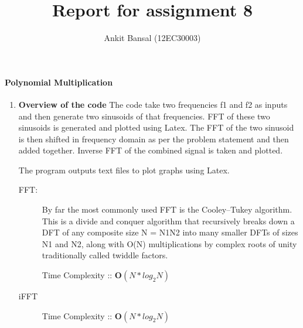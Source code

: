 \documentclass[a4paper,11pt]{article}
\title{Report for assignment 8}
\author{Ankit Bansal (12EC30003)}
\begin{document}
\maketitle

\paragraph{Polynomial Multiplication}
\begin{enumerate}
 \item \textbf{Overview of the code}
The code take two frequencies f1 and f2 as inputs and then generate two sinusoids of that frequencies. FFT of these two sinusoids is generated and plotted using Latex. The FFT of the  two sinusoid is then shifted in frequency domain as per the problem statement and then added together. Inverse FFT of the combined signal is taken and plotted.

The program outputs text files to plot graphs using Latex.
\begin{description}
  \item[FFT:]
By far the most commonly used FFT is the Cooley–Tukey algorithm. This is a divide and conquer algorithm that recursively breaks down a DFT of any composite size N = N1N2 into many smaller DFTs of sizes N1 and N2, along with O(N) multiplications by complex roots of unity traditionally called twiddle factors.

Time Complexity :: \textbf{O$\left( N*log_2N \right)$}

  \item[iFFT]

Time Complexity :: \textbf{O$\left( N*log_2N \right)$}
\end{description}
\clearpage 
\end{enumerate}
\addtolength{\oddsidemargin}{-.875in}


\end{document}
